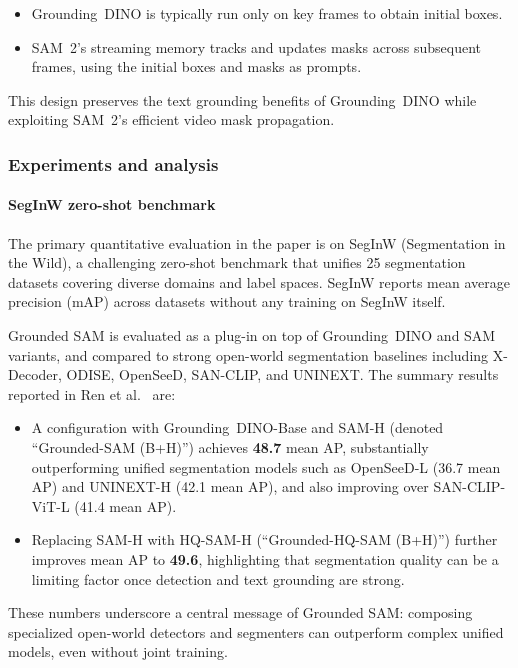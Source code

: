 \begin{enrichment}
\begin{enrichment}
		\begin{itemize}
			\item Grounding~DINO is typically run only on key frames to obtain initial boxes.
			\item SAM~2’s streaming memory tracks and updates masks across subsequent frames, using the initial boxes and masks as prompts.
		\end{itemize}
		
		This design preserves the text grounding benefits of Grounding~DINO while exploiting SAM~2’s efficient video mask propagation.
		
		\subsubsection{Experiments and analysis}
		\label{subsubsec:chapter15_groundedsam_experiments}
		
		\paragraph{SegInW zero-shot benchmark}
		The primary quantitative evaluation in the paper is on SegInW (Segmentation in the Wild), a challenging zero-shot benchmark that unifies 25 segmentation datasets covering diverse domains and label spaces.
		SegInW reports mean average precision (mAP) across datasets without any training on SegInW itself.
		
		Grounded SAM is evaluated as a plug-in on top of Grounding~DINO and SAM variants, and compared to strong open-world segmentation baselines including X-Decoder, ODISE, OpenSeeD, SAN-CLIP, and UNINEXT.
		The summary results reported in Ren et al.~\cite{ren2024_groundedsam} are:
		
		\begin{itemize}
			\item A configuration with Grounding~DINO-Base and SAM-H (denoted ``Grounded-SAM (B+H)'') achieves \textbf{48.7} mean AP, substantially outperforming unified segmentation models such as OpenSeeD-L (36.7 mean AP) and UNINEXT-H (42.1 mean AP), and also improving over SAN-CLIP-ViT-L (41.4 mean AP).
			\item Replacing SAM-H with HQ-SAM-H (``Grounded-HQ-SAM (B+H)'') further improves mean AP to \textbf{49.6}, highlighting that segmentation quality can be a limiting factor once detection and text grounding are strong.
		\end{itemize}
		
		These numbers underscore a central message of Grounded SAM: composing specialized open-world detectors and segmenters can outperform complex unified models, even without joint training.
		

\end{enrichment}
\end{enrichment}
